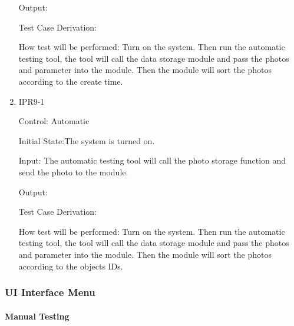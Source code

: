 \documentclass[12pt, titlepage]{article}
\begin{document}
\begin{enumerate}
Output: 

Test Case Derivation: 
					
How test will be performed:
Turn on the system. Then run the automatic testing tool, the tool will call the data storage module and pass the photos and parameter into the module. Then the module will sort the photos according to the create time.


\item{IPR9-1\\}

Control: Automatic
					
Initial State:The system is turned on.
					
Input: The automatic testing tool will call the photo storage function and send the photo to the module. 
					
Output: 

Test Case Derivation: 
					
How test will be performed:
Turn on the system. Then run the automatic testing tool, the tool will call the data storage module and pass the photos and parameter into the module. Then the module will sort the photos according to the objects IDs.


				

\end{enumerate}


\subsubsection{UI Interface Menu}


\paragraph{Manual Testing}
\end{document}
